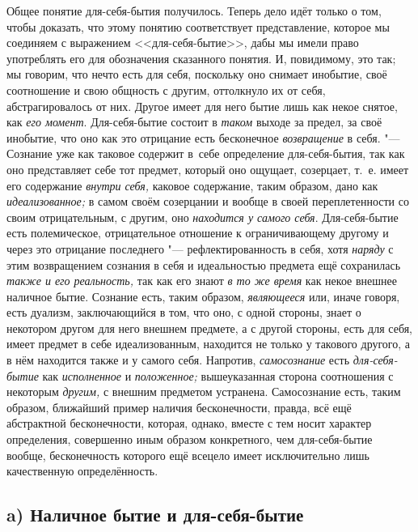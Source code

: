 Общее понятие для-себя-бытия получилось. Теперь дело идёт только о том,
чтобы доказать, что этому понятию соответствует представление, которое мы
соединяем с выражением <<для-себя-бытие>>, дабы мы имели право употреблять
его для обозначения сказанного понятия. И, повидимому, это так; мы говорим,
что нечто есть для себя, поскольку оно снимает инобытие, своё соотношение и
свою общность с другим, оттолкнуло их от себя, абстрагировалось от них.
Другое имеет для него бытие лишь как некое снятое, как
{\em его момент}. Для-себя-бытие состоит в
{\em таком} выходе за предел, за своё инобытие, что оно
как это отрицание есть бесконечное {\em возвращение} в
себя. "--- Сознание уже как таковое содержит в~себе определение
для-себя-бытия, так как оно представляет себе тот предмет, который оно
ощущает, созерцает, т.~е. имеет его содержание
{\em внутри себя,} каковое содержание, таким образом,
дано как {\em идеализованное;} в самом своём созерцании
и вообще в своей переплетенности со своим отрицательным, с другим, оно
{\em находится у самого себя}. Для-себя-бытие есть
полемическое, отрицательное отношение к ограничивающему другому и через это
отрицание последнего "--- рефлектированность в себя, хотя
{\em наряду} с этим возвращением сознания в себя и
идеальностью предмета ещё сохранилась {\em также и его
реальность,} так как его знают {\em в то же время} как
некое внешнее наличное бытие. Сознание есть, таким образом,
{\em являющееся} или, иначе говоря, есть дуализм,
заключающийся в том, что оно, с одной стороны, знает о некотором другом для
него внешнем предмете, а с другой стороны, есть для себя, имеет предмет в
себе идеализованным, находится не только у такового другого, а в нём
находится также и у самого себя. Напротив, {\em самосознание} есть
{\em для-себя-бытие} как {\em исполненное} и
{\em положенное;} вышеуказанная сторона соотношения с
некоторым {\em другим,} с внешним предметом устранена.
Самосознание есть, таким образом, ближайший пример наличия бесконечности,
правда, всё ещё абстрактной бесконечности, которая, однако, вместе с тем
носит характер определения, совершенно иным образом конкретного, чем
для-себя-бытие вообще, бесконечность которого ещё всецело имеет
исключительно лишь качественную определённость.

\subsection[a) Наличное бытие и для-себя-бытие]{a) Наличное бытие и для-себя-бытие}

